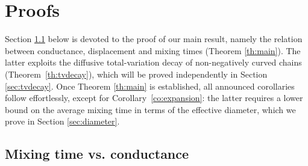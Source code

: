 \documentclass[10pt]{amsart}
\theoremstyle{definition}
\begin{document}
\section{Proofs}\label{sec:proofs}
Section \ref{sec:conductance} below is devoted to the proof of our main result, namely the relation between conductance, displacement and mixing times (Theorem \ref{th:main}). The latter exploits the diffusive total-variation decay of non-negatively curved chains (Theorem~\ref{th:tvdecay}), which will be proved independently in Section \ref{sec:tvdecay}.
Once Theorem \ref{th:main} is established, all announced corollaries follow effortlessly, except for Corollary~\ref{co:expansion}: the latter requires a lower bound on the average mixing time in terms of the effective diameter, which we prove in Section \ref{sec:diameter}.

\subsection{Mixing time vs. conductance}
\label{sec:conductance}
\end{document}
